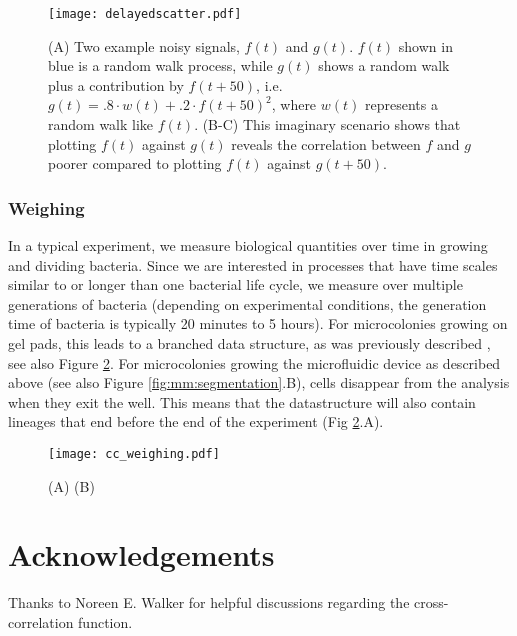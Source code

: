 {\begin{figure}
	\centering
	\texttt{[image: delayedscatter.pdf]}
	\caption{ 
		(A) Two example noisy signals, $f(t)$ and $g(t)$. $f(t)$ shown in blue is a random walk process, while $g(t)$ shows a random walk plus a contribution by $f(t+50)$, i.e. $g(t)=.8\cdot w(t)+.2\cdot f(t+50)^2$, where $w(t)$ represents a random walk like $f(t)$.
		(B-C) This imaginary scenario shows that plotting $f(t)$ against $g(t)$ reveals the correlation between $f$ and $g$ poorer compared to plotting $f(t)$ against $g(t+50)$.
	}
	\label{fig:mm:delayedscatter}
\end{figure}

\subsubsection{Weighing}

In a typical experiment, we measure biological quantities over time in growing and dividing bacteria. 
%
Since we are interested in processes that have time scales similar to or longer than one bacterial life cycle, we measure over multiple generations of bacteria (depending on experimental conditions, the generation time of bacteria is typically 20 minutes to 5 hours).
%
For microcolonies growing on gel pads, this leads to a branched data structure, as was previously described \cite{Kiviet2010,Walker2016t}, see also Figure \ref{fig:mm:weighingCCs}. 
% 
For microcolonies growing the microfluidic device as described above (see also Figure \ref{fig:mm:segmentation}.B), cells disappear from the analysis when they exit the well. This means that the datastructure will also contain lineages that end before the end of the experiment (Fig \ref{fig:mm:weighingCCs}.A).
%



\begin{figure}
	\centering
	\texttt{[image: cc\_weighing.pdf]}
	\caption{ 
		(A)
		(B)
	}
	\label{fig:mm:weighingCCs}
\end{figure}








\section*{Acknowledgements}
Thanks to Noreen E. Walker for helpful discussions regarding the cross-correlation function.

}
